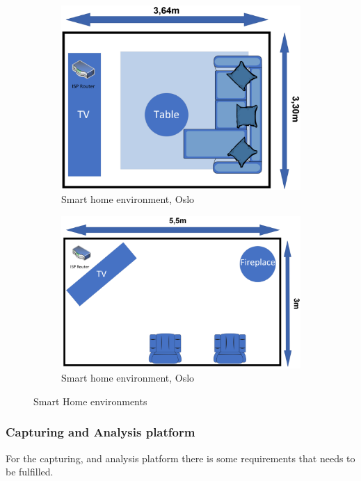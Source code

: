 \begin{figure}[H]
    \centering
    \begin{subfigure}[b]{0.80\textwidth}
        \includegraphics[width=\textwidth]{figures/Environment1.png}
        \caption{Smart home environment, Oslo}
        \label{fig:Environment1}
    \end{subfigure}
    \hfill
    \begin{subfigure}[b]{0.80\textwidth}
        \includegraphics[width=\textwidth]{figures/Environment2.png}
        \caption{Smart home environment, Oslo}
        \label{fig:Environmet2}
    \end{subfigure}
    \caption{Smart Home environments }
    \label{fig:SmartHomeEnvironments}
\end{figure}

\subsubsection{Capturing and Analysis platform}
For the capturing, and analysis platform there is some requirements that needs to be fulfilled.

